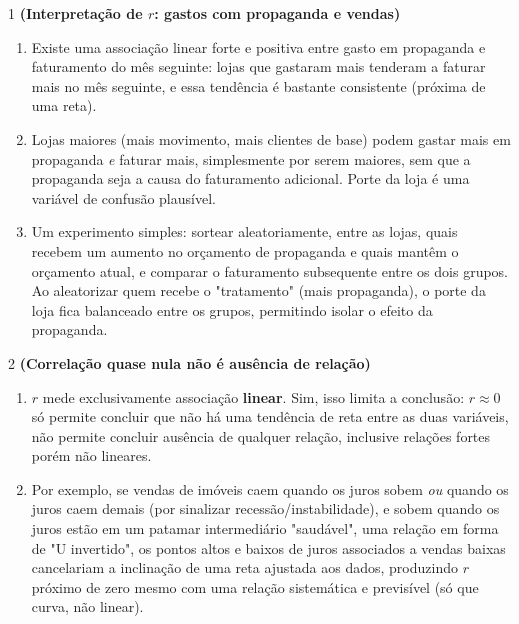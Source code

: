 \documentclass[11pt]{article}
\begin{document}

\begin{questao}{1} \textbf{(Interpretação de $r$: gastos com propaganda e vendas)}
\begin{solucao}
\begin{enumerate}[label=(\alph*)]
  \item Existe uma associação linear forte e positiva entre gasto em propaganda e faturamento do
    mês seguinte: lojas que gastaram mais tenderam a faturar mais no mês seguinte, e essa
    tendência é bastante consistente (próxima de uma reta).
  \item Lojas maiores (mais movimento, mais clientes de base) podem gastar mais em propaganda \emph{e}
    faturar mais, simplesmente por serem maiores, sem que a propaganda seja a causa do
    faturamento adicional. Porte da loja é uma variável de confusão plausível.
  \item Um experimento simples: sortear aleatoriamente, entre as lojas, quais recebem um aumento
    no orçamento de propaganda e quais mantêm o orçamento atual, e comparar o faturamento
    subsequente entre os dois grupos. Ao aleatorizar quem recebe o "tratamento" (mais propaganda),
    o porte da loja fica balanceado entre os grupos, permitindo isolar o efeito da propaganda.
\end{enumerate}
\end{solucao}
\end{questao}

\begin{questao}{2} \textbf{(Correlação quase nula não é ausência de relação)}
\begin{solucao}
\begin{enumerate}[label=(\alph*)]
  \item $r$ mede exclusivamente associação \textbf{linear}. Sim, isso limita a conclusão: $r\approx 0$
    só permite concluir que não há uma tendência de reta entre as duas variáveis, não permite
    concluir ausência de qualquer relação, inclusive relações fortes porém não lineares.
  \item Por exemplo, se vendas de imóveis caem quando os juros sobem \emph{ou} quando os juros caem
    demais (por sinalizar recessão/instabilidade), e sobem quando os juros estão em um patamar
    intermediário "saudável", uma relação em forma de "U invertido", os pontos altos e baixos de
    juros associados a vendas baixas cancelariam a inclinação de uma reta ajustada aos dados,
    produzindo $r$ próximo de zero mesmo com uma relação sistemática e previsível (só que curva,
    não linear).
\end{enumerate}
\end{solucao}
\end{questao}
\end{document}
